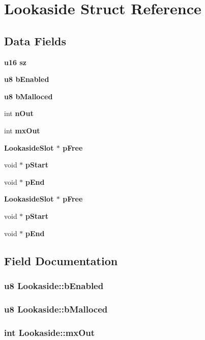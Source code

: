 \section{Lookaside Struct Reference}
\label{structLookaside}
\subsection*{Data Fields}
\begin{CompactItemize}
\item 
\bf{u16} \bf{sz}
\item 
\bf{u8} \bf{b\-Enabled}
\item 
\bf{u8} \bf{b\-Malloced}
\item 
int \bf{n\-Out}
\item 
int \bf{mx\-Out}
\item 
\bf{Lookaside\-Slot} $\ast$ \bf{p\-Free}
\item 
void $\ast$ \bf{p\-Start}
\item 
void $\ast$ \bf{p\-End}
\item 
\bf{Lookaside\-Slot} $\ast$ \bf{p\-Free}
\item 
void $\ast$ \bf{p\-Start}
\item 
void $\ast$ \bf{p\-End}
\end{CompactItemize}


\subsection{Field Documentation}
\subsubsection{\setlength{\rightskip}{0pt plus 5cm}\bf{u8} \bf{Lookaside::b\-Enabled}}\label{structLookaside_9179db20335feb2f99a87029a06848a1}


\subsubsection{\setlength{\rightskip}{0pt plus 5cm}\bf{u8} \bf{Lookaside::b\-Malloced}}\label{structLookaside_e8a212609250d6834ee73951a3bdb5e8}


\subsubsection{\setlength{\rightskip}{0pt plus 5cm}int \bf{Lookaside::mx\-Out}}\label{structLookaside_4a61ce58209a4d0105cb3bbcc28f3795}


